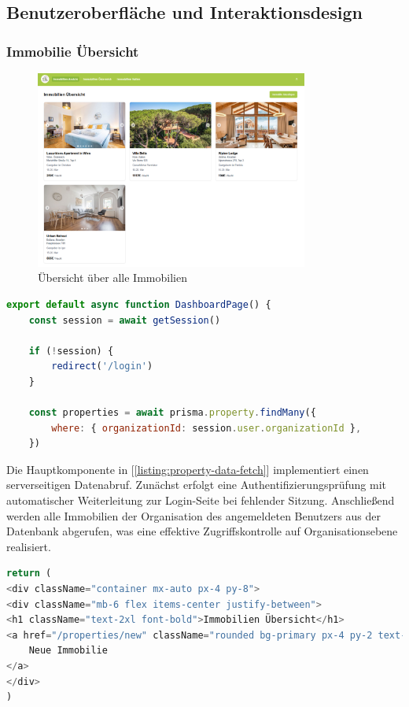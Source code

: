 \subsection{Benutzeroberfläche und Interaktionsdesign}
\subsubsection{Immobilie Übersicht}

\begin{figure}
\centering
\includegraphics[width=0.80\textwidth]{images/Immobilien_Uebersicht.png}
\caption{Übersicht über alle Immobilien}
\end{figure}


\begin{lstlisting}[language=JavaScript, caption={Datenabruf für die Immobilien-Übersicht.}, label={listing:property-data-fetch}]
export default async function DashboardPage() {
	const session = await getSession()
		
	if (!session) {
		redirect('/login')
	}
		
	const properties = await prisma.property.findMany({
		where: { organizationId: session.user.organizationId },
	})
\end{lstlisting}

	
	Die Hauptkomponente in [\ref{listing:property-data-fetch}] implementiert einen serverseitigen Datenabruf. Zunächst erfolgt eine Authentifizierungsprüfung mit automatischer Weiterleitung zur Login-Seite bei fehlender Sitzung. Anschließend werden alle Immobilien der Organisation des angemeldeten Benutzers aus der Datenbank abgerufen, was eine effektive Zugriffskontrolle auf Organisationsebene realisiert.

\newpage
    
\begin{lstlisting}[language=JavaScript, caption={Header-Bereich der Übersichtsseite.}, label={listing:property-header}]
return (
<div className="container mx-auto px-4 py-8">
<div className="mb-6 flex items-center justify-between">
<h1 className="text-2xl font-bold">Immobilien Übersicht</h1>
<a href="/properties/new" className="rounded bg-primary px-4 py-2 text-white">
	Neue Immobilie
</a>
</div>
)
\end{lstlisting}

